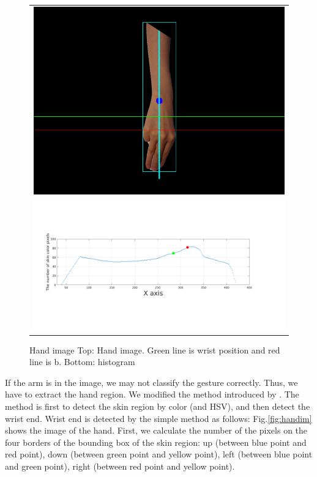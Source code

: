 \begin{figure}
 \centering
 \begin{tabular}{c}
  \includegraphics[width=\hsize]{fig6/im.png} \\
  \includegraphics[width=\hsize]{fig6/hist.png}
 \end{tabular}
 \caption{Hand image Top: Hand image. Green line is wrist position and red line is b. Bottom: histogram}
 \label{fig:handim2}
\end{figure}

If the arm is in the image, we may not classify the gesture correctly. Thus, we have to extract the hand region. We modified the method introduced by \cite{ra11}. The method is first to detect the skin region by color (and HSV), and then detect the wrist end. Wrist end is detected by the simple method as follows:
Fig.\ref{fig:handim} shows the image of the hand. 
First, we calculate the number of the pixels on the four borders of the bounding box of the skin region: 
up (between blue point and red point), 
down (between green point and yellow point), left (between blue point and green point), right (between red point and yellow point). 

